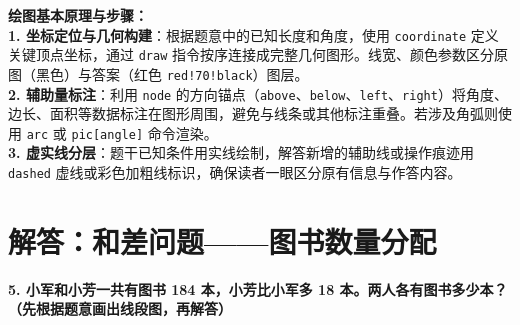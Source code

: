 {\small\color{blue!70!black}
\textbf{绘图基本原理与步骤：}\\
\textbf{1. 坐标定位与几何构建}：根据题意中的已知长度和角度，使用 \texttt{coordinate} 定义关键顶点坐标，通过 \texttt{draw} 指令按序连接成完整几何图形。线宽、颜色参数区分原图（黑色）与答案（红色 \texttt{red!70!black}）图层。\\
\textbf{2. 辅助量标注}：利用 \texttt{node} 的方向锚点（\texttt{above}、\texttt{below}、\texttt{left}、\texttt{right}）将角度、边长、面积等数据标注在图形周围，避免与线条或其他标注重叠。若涉及角弧则使用 \texttt{arc} 或 \texttt{pic[angle]} 命令渲染。\\
\textbf{3. 虚实线分层}：题干已知条件用实线绘制，解答新增的辅助线或操作痕迹用 \texttt{dashed} 虚线或彩色加粗线标识，确保读者一眼区分原有信息与作答内容。
}


\newpage



\section{解答：和差问题——图书数量分配}

\vspace{0.4cm}

\noindent\textbf{5. 小军和小芳一共有图书 184 本，小芳比小军多 18 本。两人各有图书多少本？（先根据题意画出线段图，再解答）}

\vspace{0.8cm}

